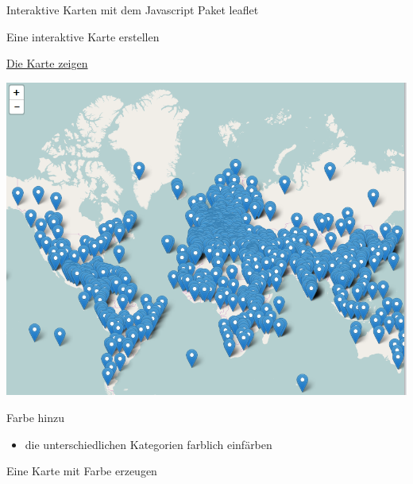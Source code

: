 \documentclass[ignorenonframetext,]{beamer}
\newenvironment{Shaded}{}{}
\newcommand{\KeywordTok}[1]{\textcolor[rgb]{0.00,0.44,0.13}{\textbf{{#1}}}}
\newcommand{\DataTypeTok}[1]{\textcolor[rgb]{0.56,0.13,0.00}{{#1}}}
\newcommand{\StringTok}[1]{\textcolor[rgb]{0.25,0.44,0.63}{{#1}}}
\newcommand{\NormalTok}[1]{{#1}}
\providecommand{\tightlist}{%
\setlength{\itemsep}{0pt}\setlength{\parskip}{0pt}}
\begin{document}
\begin{frame}[fragile]{Interaktive Karten mit dem Javascript Paket
leaflet}
\begin{block}{Eine interaktive Karte erstellen}
\end{block}

\begin{block}{\href{https://rpubs.com/Japhilko82/WorldHeritageSites}{Die
Karte zeigen}}

\includegraphics{./tex2pdf.9796/5d9dbf801ab1bb41813925da4cff1a84779f8070.png}

\end{block}

\begin{block}{Farbe hinzu}

\begin{itemize}
\tightlist
\item
  die unterschiedlichen Kategorien farblich einfärben
\end{itemize}

\begin{Shaded}
\end{Shaded}

\begin{block}{Eine Karte mit Farbe erzeugen}

\begin{Shaded}
\end{Shaded}


\end{block}
\end{block}
\end{frame}
\end{document}
